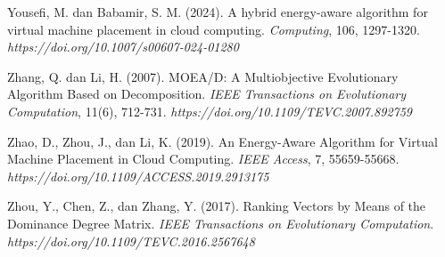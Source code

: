 \begin{thebibliography}{99}
	

	Yousefi, M. dan Babamir, S. M. (2024). A hybrid energy-aware algorithm for virtual machine placement in cloud computing. \textit{Computing}, 106, 1297-1320. \textit{https://doi.org/10.1007/s00607-024-01280}
	
	

	Zhang, Q. dan Li, H. (2007). MOEA/D: A Multiobjective Evolutionary Algorithm Based on Decomposition. \textit{IEEE Transactions on Evolutionary Computation}, 11(6), 712-731. \textit{https://doi.org/10.1109/TEVC.2007.892759}
	
	

	Zhao, D., Zhou, J., dan Li, K. (2019). An Energy-Aware Algorithm for Virtual Machine Placement in Cloud Computing. \textit{IEEE Access}, 7, 55659-55668. \textit{https://doi.org/10.1109/ACCESS.2019.2913175}
	
	

	Zhou, Y., Chen, Z., dan Zhang, Y. (2017). Ranking Vectors by Means of the Dominance Degree Matrix. \textit{IEEE Transactions on Evolutionary Computation}. \textit{https://doi.org/10.1109/TEVC.2016.2567648}
	
  
	
\end{thebibliography}
